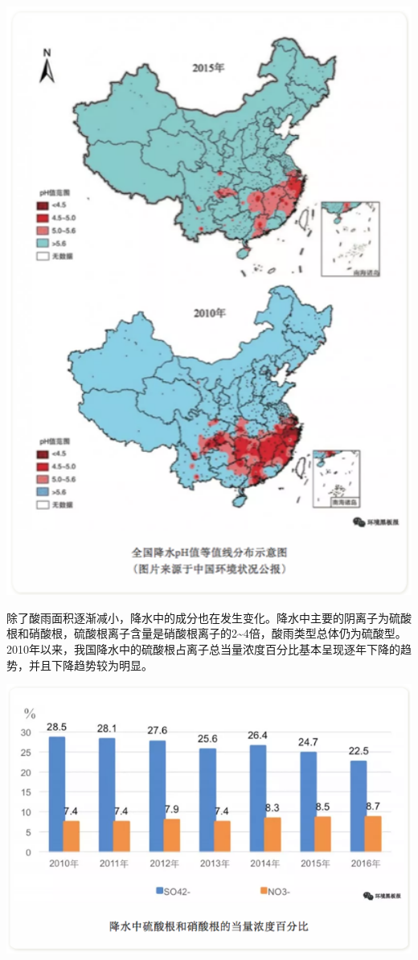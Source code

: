 \documentclass[
]{book}
\begin{document}
\includegraphics[width=5.74in]{images/acidrain2}

除了酸雨面积逐渐减小，降水中的成分也在发生变化。降水中主要的阴离子为硫酸根和硝酸根，硫酸根离子含量是硝酸根离子的2\textasciitilde4倍，酸雨类型总体仍为硫酸型。2010年以来，我国降水中的硫酸根占离子总当量浓度百分比基本呈现逐年下降的趋势，并且下降趋势较为明显。

\includegraphics[width=8.33in]{images/acidrain3}
\end{document}
